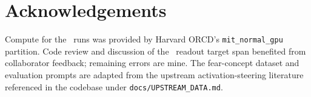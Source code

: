 \section*{Acknowledgements}

Compute for the \mixtral~runs was provided by Harvard ORCD's
\texttt{mit\_normal\_gpu} partition. Code review and discussion of the
\steermoe~readout target span benefited from collaborator feedback;
remaining errors are mine. The fear-concept dataset and evaluation
prompts are adapted from the upstream activation-steering literature
referenced in the codebase under
\texttt{docs/UPSTREAM\_DATA.md}.
